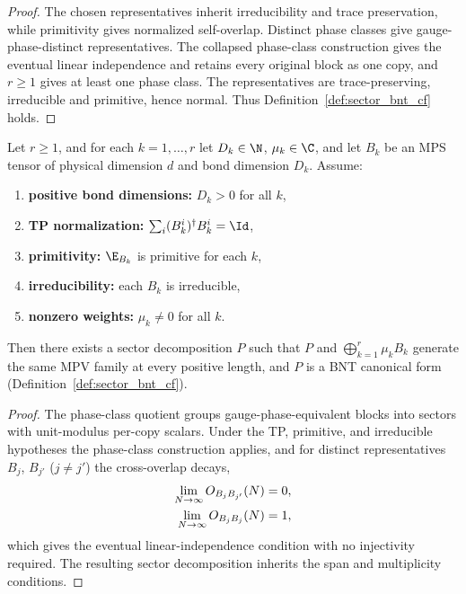 \begin{proof}\leanok
    The chosen representatives inherit irreducibility and trace preservation,
    while primitivity gives normalized self-overlap. Distinct phase classes
    give gauge-phase-distinct representatives. The collapsed phase-class
    construction gives the eventual linear independence and retains every
    original block as one copy, and $r\ge1$ gives at least one phase class.
    The representatives are trace-preserving, irreducible and primitive, hence
    normal. Thus Definition~\ref{def:sector_bnt_cf} holds.
\end{proof}

\begin{lemma}%
    \label{thm:paperbnt_supplier_prepared}
    \leanok
    Let $r \ge 1$, and for each $k = 1,\ldots,r$ let $D_k \in \N$,
    $\mu_k \in \C$, and let $B_k$ be an MPS tensor of physical dimension $d$ and
    bond dimension $D_k$. Assume:
    \begin{enumerate}
        \item \textbf{positive bond dimensions:} $D_k > 0$ for all $k$,
        \item \textbf{TP normalization:} $\sum_i (B_k^i)^\dagger B_k^i = \Id$,
        \item \textbf{primitivity:} $\E_{B_k}$ is primitive for each $k$,
        \item \textbf{irreducibility:} each $B_k$ is irreducible,
        \item \textbf{nonzero weights:} $\mu_k \neq 0$ for all $k$.
    \end{enumerate}
    Then there exists a sector decomposition $P$ such that $P$ and
    $\bigoplus_{k=1}^{r} \mu_k B_k$ generate the same MPV family at every
    positive length,
    and $P$ is a BNT canonical form (Definition~\ref{def:sector_bnt_cf}).
\end{lemma}

\begin{proof}\leanok
    The phase-class quotient groups gauge-phase-equivalent blocks into sectors
    with unit-modulus per-copy scalars. Under the TP, primitive, and irreducible
    hypotheses the phase-class construction applies, and for distinct
    representatives $B_j$, $B_{j'}$ ($j \neq j'$) the cross-overlap decays,
    \begin{align}
        \lim_{N\to\infty} O_{B_j B_{j'}}(N) & =0,
        \notag                                    \\
        \lim_{N\to\infty} O_{B_j B_j}(N)    & =1,
        \notag
    \end{align}
    which gives the eventual linear-independence condition with no injectivity
    required. The resulting sector decomposition inherits the span and
    multiplicity conditions.
\end{proof}

